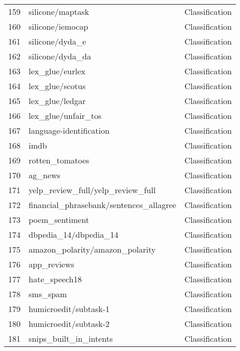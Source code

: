 \documentclass[11pt]{article}
\begin{document}
\begin{longtable}{lll}
159 & silicone/maptask \citep{thompson1993hcrc} & Classification \\
160 & silicone/iemocap \citep{busso2008iemocap} & Classification \\
161 & silicone/dyda\_e \citep{li2017dailydialog} & Classification \\
162 & silicone/dyda\_da \citep{li2017dailydialog} & Classification \\
163 & lex\_glue/eurlex \citep{chalkidis-etal-2021-multieurlex} & Classification \\
164 & lex\_glue/scotus \citep{spaeth2020} & Classification \\
165 & lex\_glue/ledgar \citep{tuggener-etal-2020-ledgar} & Classification \\
166 & lex\_glue/unfair\_tos \citep{lippi-etal-2019-claudette} & Classification \\
167 & language-identification & Classification \\
168 & imdb \citep{maas-EtAl:2011:ACL-HLT2011} & Classification \\
169 & rotten\_tomatoes \citep{Pang+Lee:05a} & Classification \\
170 & ag\_news \citep{Zhang2015CharacterlevelCN} & Classification \\
171 & yelp\_review\_full/yelp\_review\_full \citep{zhang2015character} & Classification \\
172 & financial\_phrasebank/sentences\_allagree \citep{Malo2014GoodDO} & Classification \\
173 & poem\_sentiment \citep{sheng2020investigating} & Classification \\
174 & dbpedia\_14/dbpedia\_14 \citep{lehmann2015dbpedia} & Classification \\
175 & amazon\_polarity/amazon\_polarity \citep{mcauley2013hidden} & Classification \\
176 & app\_reviews \citep{ZurichOpenRepositoryandArchive:dataset} & Classification \\
177 & hate\_speech18 \citep{gibert2018hate} & Classification \\
178 & sms\_spam \citep{Almeida2011SpamFiltering} & Classification \\
179 & humicroedit/subtask-1 \citep{hossain2019president} & Classification \\
180 & humicroedit/subtask-2 \citep{hossain2019president} & Classification \\
181 & snips\_built\_in\_intents \citep{DBLP:journals/corr/abs-1805-10190} & Classification \\

\end{longtable}
\end{document}
